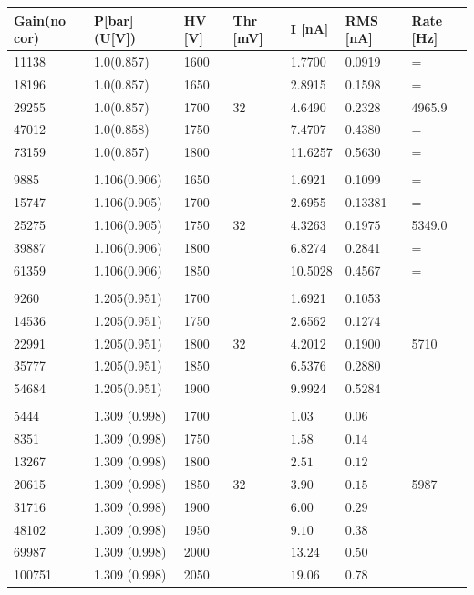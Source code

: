 \documentclass[12pt,a4paper]{article}
\begin{document}
	\begin{table}[!h]
	\centering
	\begin{tabular}{|l|l|l|l|l|l|l|}
		\hline
		Gain(no cor) & P[bar] (U[V]) & HV [V] & Thr [mV]&  I [nA] & RMS [nA] & Rate [Hz]  \\
		\hline
		11138 & 1.0(0.857) & 1600 & &  1.7700 & 0.0919 & = \\
		\hline
		18196 & 1.0(0.857) & 1650 & &  2.8915 & 0.1598 & = \\
		\hline
		29255 & 1.0(0.857) & 1700 & 32 & 4.6490 & 0.2328 & 4965.9 \\
		\hline
		47012 & 1.0(0.858) & 1750 & & 7.4707 & 0.4380 & = \\
		\hline
		73159 & 1.0(0.857) & 1800 & & 11.6257 & 0.5630 & = \\
		\hline
		
		& & & & & & \\
		\hline
		
		9885 & 1.106(0.906) & 1650 & & 1.6921 & 0.1099 & = \\
		\hline
		15747 & 1.106(0.905)& 1700 & & 2.6955 & 0.13381 & = \\
		\hline
		25275 & 1.106(0.905)& 1750 & 32 & 4.3263 & 0.1975 & 5349.0 \\
		\hline
		39887 & 1.106(0.906)& 1800 & & 6.8274 & 0.2841 & = \\
		\hline
		61359 & 1.106(0.906)& 1850 & & 10.5028 & 0.4567 & = \\
		\hline
		
		& & & & & & \\
		\hline
		
		9260 & 1.205(0.951) & 1700  & & 1.6921 & 0.1053 & \\
		\hline
		14536 & 1.205(0.951) & 1750 & & 2.6562 & 0.1274 & \\
		\hline
		22991 & 1.205(0.951) & 1800 & 32 & 4.2012 & 0.1900 & 5710 \\
		\hline
		35777 & 1.205(0.951) & 1850 & & 6.5376 & 0.2880 & \\
		\hline
		54684 & 1.205(0.951) & 1900 & & 9.9924 & 0.5284 & \\
		\hline
		
		& & & & & & \\
		\hline
		
		5444 & 1.309 (0.998) & 1700 &  & $1.03 $ & $ 0.06 $ & \\
		\hline
		8351 & 1.309 (0.998) & 1750 &  & $1.58 $ & $ 0.14$ & \\
		\hline
		13267 & 1.309 (0.998) & 1800 &  & $2.51 $ & $ 0.12 $ & \\
		\hline
		20615 & 1.309 (0.998) & 1850 & 32 & $3.90 $ & $ 0.15 $ & 5987 \\
		\hline
		31716 & 1.309 (0.998) & 1900 &  & $6.00 $ & $ 0.29 $ & \\
		\hline
		48102 & 1.309 (0.998) & 1950 &  & $9.10 $ & $ 0.38 $ & \\
		\hline
		69987 & 1.309 (0.998) & 2000 &  & $13.24 $ & $ 0.50 $ & \\
		\hline
		100751 & 1.309 (0.998) & 2050 &  & $19.06 $ & $ 0.78 $ & \\
		\hline
		

\end{tabular}
\end{table}
\end{document}
